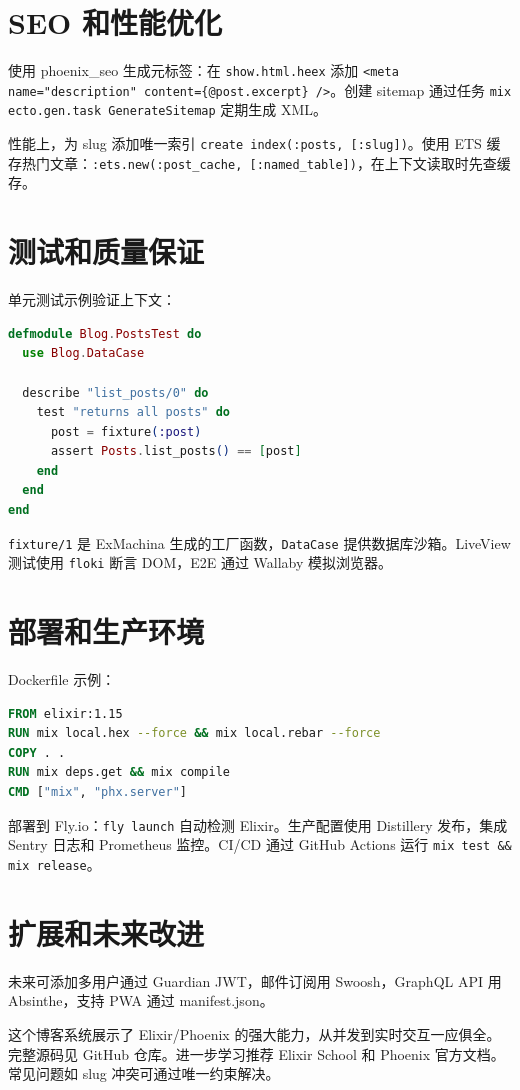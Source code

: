 \chapter{SEO 和性能优化}
使用 phoenix\_{}seo 生成元标签：在 \texttt{show.html.heex} 添加 \texttt{<meta name="description" content=\{{}@post.excerpt\}{} />}。创建 sitemap 通过任务 \texttt{mix ecto.gen.task GenerateSitemap} 定期生成 XML。\par
性能上，为 slug 添加唯一索引 \texttt{create index(:posts, [:slug])}。使用 ETS 缓存热门文章：\texttt{:ets.new(:post\_{}cache, [:named\_{}table])}，在上下文读取时先查缓存。\par
\chapter{测试和质量保证}
单元测试示例验证上下文：\par
\begin{lstlisting}[language=elixir]
defmodule Blog.PostsTest do
  use Blog.DataCase

  describe "list_posts/0" do
    test "returns all posts" do
      post = fixture(:post)
      assert Posts.list_posts() == [post]
    end
  end
end
\end{lstlisting}
\texttt{fixture/1} 是 ExMachina 生成的工厂函数，\texttt{DataCase} 提供数据库沙箱。LiveView 测试使用 \texttt{floki} 断言 DOM，E2E 通过 Wallaby 模拟浏览器。\par
\chapter{部署和生产环境}
Dockerfile 示例：\par
\begin{lstlisting}[language=dockerfile]
FROM elixir:1.15
RUN mix local.hex --force && mix local.rebar --force
COPY . .
RUN mix deps.get && mix compile
CMD ["mix", "phx.server"]
\end{lstlisting}
部署到 Fly.io：\texttt{fly launch} 自动检测 Elixir。生产配置使用 Distillery 发布，集成 Sentry 日志和 Prometheus 监控。CI/CD 通过 GitHub Actions 运行 \texttt{mix test \&{}\&{} mix release}。\par
\chapter{扩展和未来改进}
未来可添加多用户通过 Guardian JWT，邮件订阅用 Swoosh，GraphQL API 用 Absinthe，支持 PWA 通过 manifest.json。\par
这个博客系统展示了 Elixir/Phoenix 的强大能力，从并发到实时交互一应俱全。完整源码见 GitHub 仓库。进一步学习推荐 Elixir School 和 Phoenix 官方文档。常见问题如 slug 冲突可通过唯一约束解决。\par
